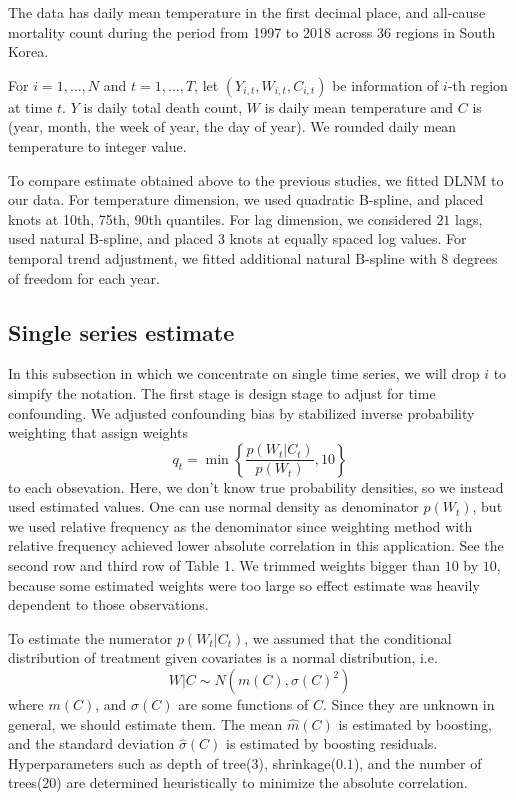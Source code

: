 \documentclass[12pt]{article}
\begin{document}

The data has daily mean temperature in the first decimal place, and
all-cause mortality count during the period from 1997 to 2018 across 36 regions in South Korea.

For $i = 1, \dots, N$ and $t = 1, \dots, T$, 
let $(Y_{i,t}, W_{i,t}, C_{i,t})$ be information of $i$-th region at time $t$.
$Y$ is daily total death count, $W$ is daily mean temperature 
and $C$ is (year, month, the week of year, the day of year).
We rounded daily mean temperature to integer value.

To compare estimate obtained above to the previous studies, we fitted DLNM to our data.
For temperature dimension, 
we used quadratic B-spline, and placed knots at 10th, 75th, 90th quantiles.
For lag dimension,
we considered $21$ lags, used natural B-spline, and placed $3$ knots at equally spaced log values.
For temporal trend adjustment,
we fitted additional natural B-spline with $8$ degrees of freedom for each year.

\subsection{Single series estimate}

In this subsection in which we concentrate on single time series, 
we will drop $i$ to simpify the notation.
The first stage is design stage to adjust for time confounding.
We adjusted confounding bias by stabilized inverse probability weighting\cite{sipw2010}
that assign weights
\[
	q_t = \min{ \left \{ \frac{p(W_t \lvert C_t)}{p(W_t)}, 10 \right \} }
\]
to each obsevation.
Here, we don't know true probability densities,
so we instead used estimated values.
One can use normal density as denominator $p(W_t)$,
but we used relative frequency as the denominator
since weighting method with relative frequency achieved 
lower absolute correlation in this application.
See the second row and third row of Table 1.
We trimmed weights bigger than $10$ by $10$,
because some estimated weights were too large so
effect estimate was heavily dependent to those observations.

To estimate the numerator $p(W_t \lvert C_t)$, 
we assumed that the conditional distribution of treatment given covariates is a normal distribution, i.e.
\[ 
	W\lvert C \sim N(m(C), \sigma(C)^2) 
\] 
where $m(C)$, and $\sigma(C)$ are some functions of $C$.
Since they are unknown in general, we should estimate them. 
The mean $\hat{m}(C)$ is estimated by boosting, 
and the standard deviation $\hat{\sigma}(C)$ is estimated by boosting residuals\cite{hirano2004, gpsboosting2015}.
Hyperparameters such as depth of tree($3$), shrinkage($0.1$), and the number of trees($20$) 
are determined heuristically to minimize the absolute correlation.
\end{document}
